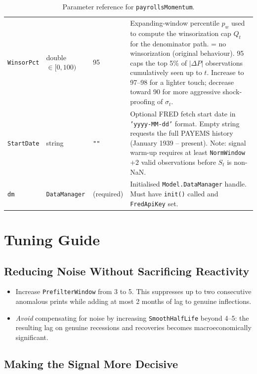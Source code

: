 \documentclass[11pt, a4paper]{article}
\newcommand{\dP}{\Delta P}
\begin{document}
\begin{table}[H]
\begin{tabular}{p{3.8cm} p{1.4cm} p{1.4cm} p{7.4cm}}
\texttt{WinsorPct} &
  double $\in [0, 100)$ &
  95 &
  Expanding-window percentile $p_w$ used to compute the winsorization cap $Q_t$ for the denominator path.\newline
  0 = no winsorization (original behaviour). 95 caps the top 5\% of $|\dP|$ observations cumulatively seen up to $t$. Increase to 97--98 for a lighter touch; decrease toward 90 for more aggressive shock-proofing of $\sigma_t$. \\

\texttt{StartDate} &
  string &
  \texttt{""} &
  Optional FRED fetch start date in \texttt{'yyyy-MM-dd'} format. Empty string requests the full PAYEMS history (January 1939 -- present). Note: signal warm-up requires at least \texttt{NormWindow}$+2$ valid observations before $S_t$ is non-NaN. \\
\midrule
\texttt{dm} &
  \texttt{DataManager} &
  (required) &
  Initialised \texttt{Model.DataManager} handle. Must have \texttt{init()} called and \texttt{FredApiKey} set. \\
\bottomrule
\end{tabular}
\caption{Parameter reference for \texttt{payrollsMomentum}.}
\label{tab:params}
\end{table}

\section{Tuning Guide}
\label{sec:tuning}

\subsection{Reducing Noise Without Sacrificing Reactivity}

\begin{itemize}[leftmargin=2em]
  \item Increase \texttt{PrefilterWindow} from 3 to 5. This suppresses
        up to two consecutive anomalous prints while adding at most
        2 months of lag to genuine inflections.
  \item \emph{Avoid} compensating for noise by increasing
        \texttt{SmoothHalfLife} beyond 4--5: the resulting lag on
        genuine recessions and recoveries becomes macroeconomically
        significant.
\end{itemize}

\subsection{Making the Signal More Decisive}
\end{document}
